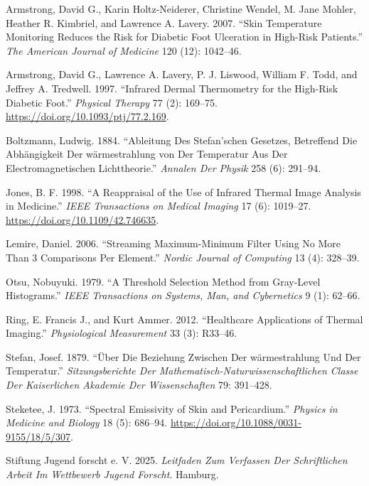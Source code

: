\documentclass[
  11pt,
]{article}
\newlength{\cslhangindent}
\newenvironment{CSLReferences}[2] %
 {\begin{list}{}{%
  \setlength{\itemindent}{0pt}
  \setlength{\leftmargin}{0pt}
  \setlength{\parsep}{0pt}
  \ifodd #1
   \setlength{\leftmargin}{\cslhangindent}
   \setlength{\itemindent}{-1\cslhangindent}
  \fi
  \setlength{\itemsep}{#2\baselineskip}}}
 {\end{list}}
\begin{document}
\protect{}\label{refs}
\begin{CSLReferences}{1}{1}
Armstrong, David G., Karin Holtz-Neiderer, Christine Wendel, M. Jane
Mohler, Heather R. Kimbriel, and Lawrence A. Lavery. 2007. {``Skin
Temperature Monitoring Reduces the Risk for Diabetic Foot Ulceration in
High-Risk Patients.''} \emph{The American Journal of Medicine} 120 (12):
1042--46.

Armstrong, David G., Lawrence A. Lavery, P. J. Liswood, William F. Todd,
and Jeffrey A. Tredwell. 1997. {``Infrared Dermal Thermometry for the
High-Risk Diabetic Foot.''} \emph{Physical Therapy} 77 (2): 169--75.
\url{https://doi.org/10.1093/ptj/77.2.169}.

Boltzmann, Ludwig. 1884. {``Ableitung Des Stefan'schen Gesetzes,
Betreffend Die Abh{ä}ngigkeit Der w{ä}rmestrahlung von Der Temperatur
Aus Der Electromagnetischen Lichttheorie.''} \emph{Annalen Der Physik}
258 (6): 291--94.

Jones, B. F. 1998. {``A Reappraisal of the Use of Infrared Thermal Image
Analysis in Medicine.''} \emph{IEEE Transactions on Medical Imaging} 17
(6): 1019--27. \url{https://doi.org/10.1109/42.746635}.

Lemire, Daniel. 2006. {``Streaming Maximum-Minimum Filter Using No More
Than 3 Comparisons Per Element.''} \emph{Nordic Journal of Computing} 13
(4): 328--39.

Otsu, Nobuyuki. 1979. {``A Threshold Selection Method from Gray-Level
Histograms.''} \emph{IEEE Transactions on Systems, Man, and Cybernetics}
9 (1): 62--66.

Ring, E. Francis J., and Kurt Ammer. 2012. {``Healthcare Applications of
Thermal Imaging.''} \emph{Physiological Measurement} 33 (3): R33--46.

Stefan, Josef. 1879. {``{Ü}ber Die Beziehung Zwischen Der
w{ä}rmestrahlung Und Der Temperatur.''} \emph{Sitzungsberichte Der
Mathematisch-Naturwissenschaftlichen Classe Der Kaiserlichen Akademie
Der Wissenschaften} 79: 391--428.

Steketee, J. 1973. {``Spectral Emissivity of Skin and Pericardium.''}
\emph{Physics in Medicine and Biology} 18 (5): 686--94.
\url{https://doi.org/10.1088/0031-9155/18/5/307}.

Stiftung Jugend forscht e. V. 2025. \emph{Leitfaden Zum Verfassen Der
Schriftlichen Arbeit Im Wettbewerb Jugend Forscht}. Hamburg.

\end{CSLReferences}
\end{document}

